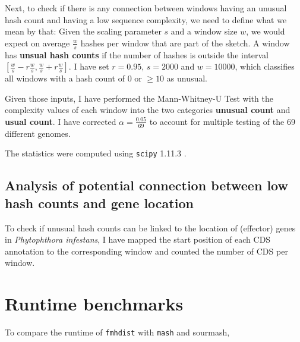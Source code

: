 Next, to check if there is any connection between windows having an unusual hash
count and having a low sequence complexity, we need to define what we mean by
that: Given the scaling parameter $s$ and a window size $w$, we would expect on
average $\frac{w}{s}$ hashes per window that are part of the sketch. A window
has \textbf{unsual hash counts} if the number of hashes is outside the interval
$[\frac{w}{s} - r \frac{w}{s}, \frac{w}{s} + r \frac{w}{s}]$. I have set
$r=0.95$, $s=2000$ and $w=10000$, which classifies all windows with a hash count
of $0$ or $\geq 10$ as unusual.

Given those inputs, I have performed the Mann-Whitney-U Test
\cite{mannTestWhetherOne1947,wilcoxonIndividualComparisonsRanking1945} with the
complexity values of each window into the two categories \textbf{unusual count}
and \textbf{usual count}. I have corrected $\alpha = \frac{0.05}{69}$ to account
for multiple testing of the 69 different genomes.

The statistics were computed using \texttt{scipy} 1.11.3
\cite{virtanenSciPyFundamentalAlgorithms2020}.

\subsection*{Analysis of potential connection between low hash counts and gene location}
To check if unusual hash counts can be linked to the location of (effector)
genes in \textit{Phytophthora infestans}, I have mapped the start position of
each CDS annotation to the corresponding window and counted the number of CDS
per window.

\section{Runtime benchmarks}
To compare the runtime of \texttt{fmhdist} with \texttt{mash} and sourmash,
